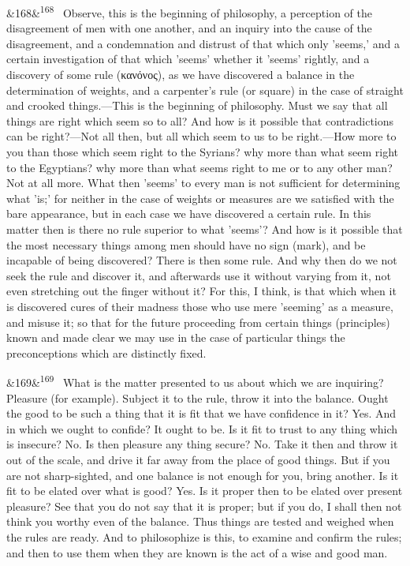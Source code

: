 \documentclass[12pt]{article}
\newcommand{\para}[1][]{\par\noindent\ifx&#1&\else\textsuperscript{\footnotesize #1}~\fi}
\begin{document}
\para[168] Observe, this is the beginning of philosophy, a perception of the disagreement of men with one another, and an inquiry into the cause of the disagreement, and a condemnation and distrust of that which only 'seems,' and a certain investigation of that which 'seems' whether it 'seems' rightly, and a discovery of some rule (κανόνος), as we have discovered a balance in the determination of weights, and a carpenter's rule (or square) in the case of straight and crooked things.—This is the beginning of philosophy. Must we say that all things are right which seem so to all? And how is it possible that contradictions can be right?—Not all then, but all which seem to us to be right.—How more to you than those which seem right to the Syrians? why more than what seem right to the Egyptians? why more than what seems right to me or to any other man? Not at all more. What then 'seems' to every man is not sufficient for determining what 'is;' for neither in the case of weights or measures are we satisfied with the bare appearance, but in each case we have discovered a certain rule. In this matter then is there no rule superior to what 'seems'? And how is it possible that the most necessary things among men should have no sign (mark), and be incapable of being discovered? There is then some rule. And why then do we not seek the rule and discover it, and afterwards use it without varying from it, not even stretching out the finger without it? For this, I think, is that which when it is discovered cures of their madness those who use mere 'seeming' as a measure, and misuse it; so that for the future proceeding from certain things (principles) known and made clear we may use in the case of particular things the preconceptions which are distinctly fixed.

\para[169] What is the matter presented to us about which we are inquiring? Pleasure (for example). Subject it to the rule, throw it into the balance. Ought the good to be such a thing that it is fit that we have confidence in it? Yes. And in which we ought to confide? It ought to be. Is it fit to trust to any thing which is insecure? No. Is then pleasure any thing secure? No. Take it then and throw it out of the scale, and drive it far away from the place of good things. But if you are not sharp-sighted, and one balance is not enough for you, bring another. Is it fit to be elated over what is good? Yes. Is it proper then to be elated over present pleasure? See that you do not say that it is proper; but if you do, I shall then not think you worthy even of the balance. Thus things are tested and weighed when the rules are ready. And to philosophize is this, to examine and confirm the rules; and then to use them when they are known is the act of a wise and good man.
\end{document}
